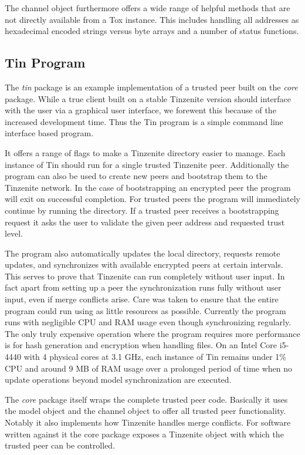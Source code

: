 The channel object furthermore offers a wide range of helpful methods that are not directly available from a Tox instance.
This includes handling all addresses as hexadecimal encoded strings versus byte arrays and a number of status functions.

\subsection{Tin Program}
\label{sub:Tin Program}

The \emph{tin} package is an example implementation of a trusted peer built on the \emph{core} package.
While a true client built on a stable Tinzenite version should interface with the user via a graphical user interface, we forewent this because of the increased development time.
Thus the Tin program is a simple command line interface based program.

It offers a range of flags to make a Tinzenite directory easier to manage.
Each instance of Tin should run for a single trusted Tinzenite peer.
Additionally the program can also be used to create new peers and bootstrap them to the Tinzenite network.
In the case of bootstrapping an encrypted peer the program will exit on successful completion.
For trusted peers the program will immediately continue by running the directory.
If a trusted peer receives a bootstrapping request it asks the user to validate the given peer address and requested trust level.

The program also automatically updates the local directory, requests remote updates, and synchronizes with available encrypted peers at certain intervals.
This serves to prove that Tinzenite can run completely without user input.
In fact apart from setting up a peer the synchronization runs fully without user input, even if merge conflicts arise.
Care was taken to ensure that the entire program could run using as little resources as possible.
Currently the program runs with negligible CPU and RAM usage even though synchronizing regularly.
The only truly expensive operation where the program requires more performance is for hash generation and encryption when handling files.
On an Intel Core i5-4440 with 4 physical cores at 3.1 GHz, each instance of Tin remains under 1\% CPU and around 9 MB of RAM usage over a prolonged period of time when no update operations beyond model synchronization are executed.

The \emph{core} package itself wraps the complete trusted peer code.
Basically it uses the model object and the channel object to offer all trusted peer functionality.
Notably it also implements how Tinzenite handles merge conflicts.
For software written against it the core package exposes a Tinzenite object with which the trusted peer can be controlled.

